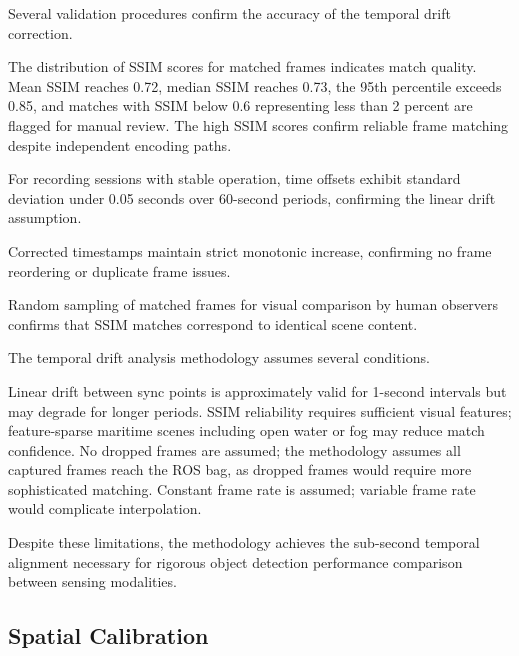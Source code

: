 \documentclass{erauthesis}
\begin{document}

Several validation procedures confirm the accuracy of the temporal drift correction.


The distribution of SSIM scores for matched frames indicates match quality.
Mean SSIM reaches 0.72, median SSIM reaches 0.73, the 95th percentile exceeds 0.85, and matches with SSIM below 0.6 representing less than 2 percent are flagged for manual review.
The high SSIM scores confirm reliable frame matching despite independent encoding paths.


For recording sessions with stable operation, time offsets exhibit standard deviation under 0.05 seconds over 60-second periods, confirming the linear drift assumption.


Corrected timestamps maintain strict monotonic increase, confirming no frame reordering or duplicate frame issues.


Random sampling of matched frames for visual comparison by human observers confirms that SSIM matches correspond to identical scene content.


The temporal drift analysis methodology assumes several conditions.

Linear drift between sync points is approximately valid for 1-second intervals but may degrade for longer periods.
SSIM reliability requires sufficient visual features; feature-sparse maritime scenes including open water or fog may reduce match confidence.
No dropped frames are assumed; the methodology assumes all captured frames reach the ROS bag, as dropped frames would require more sophisticated matching.
Constant frame rate is assumed; variable frame rate would complicate interpolation.

Despite these limitations, the methodology achieves the sub-second temporal alignment necessary for rigorous object detection performance comparison between sensing modalities.

\subsection{Spatial Calibration} \label{spatial_calibration}
\end{document}
